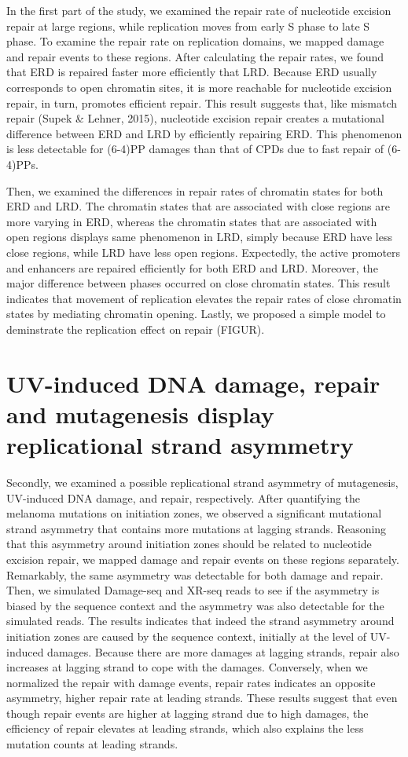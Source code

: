 In the first part of the study, we examined the repair rate of nucleotide excision repair at large regions, while replication moves from early S phase to late S phase. To examine the repair rate on replication domains, we mapped damage and repair events to these regions. After calculating the repair rates, we found that ERD is repaired faster more efficiently that LRD. Because ERD usually corresponds to open chromatin sites, it is more reachable for nucleotide excision repair, in turn, promotes efficient repair. This result suggests that, like mismatch repair (Supek \& Lehner, 2015), nucleotide excision repair creates a mutational difference between ERD and LRD by efficiently repairing ERD. This phenomenon is less detectable for (6-4)PP damages than that of CPDs due to fast repair of (6-4)PPs.

Then, we examined the differences in repair rates of chromatin states for both ERD and LRD. The chromatin states that are associated with close regions are more varying in ERD, whereas the chromatin states that are associated with open regions displays same phenomenon in LRD, simply because ERD have less close regions, while LRD have less open regions. Expectedly, the active promoters and enhancers are repaired efficiently for both ERD and LRD. Moreover, the major difference between phases occurred on close chromatin states. This result indicates that movement of replication elevates the repair rates of close chromatin states by mediating chromatin opening. Lastly, we proposed a simple model to deminstrate the replication effect on repair (FIGUR).     

\section{UV-induced DNA damage, repair and mutagenesis display replicational strand asymmetry}

Secondly, we examined a possible replicational strand asymmetry of mutagenesis, UV-induced DNA damage, and repair, respectively. After quantifying the melanoma mutations on initiation zones, we observed a significant mutational strand asymmetry that contains more mutations at lagging strands. Reasoning that this asymmetry around initiation zones should be related to nucleotide excision repair, we mapped damage and repair events on these regions separately. Remarkably, the same asymmetry was detectable for both damage and repair. Then, we simulated Damage-seq and XR-seq reads to see if the asymmetry is biased by the sequence context and the asymmetry was also detectable for the simulated reads. The results indicates that indeed the strand asymmetry around initiation zones are caused by the sequence context, initially at the level of UV-induced damages. Because there are more damages at lagging strands, repair also increases at lagging strand to cope with the damages. Conversely, when we normalized the repair with damage events, repair rates indicates an opposite asymmetry, higher repair rate at leading strands. These results suggest that even though repair events are higher at lagging strand due to high damages, the efficiency of repair elevates at leading strands, which also explains the less mutation counts at leading strands.         
